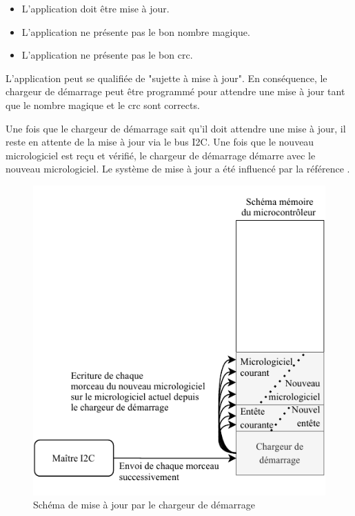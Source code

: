 \begin{itemize}
    \item L'application doit être mise à jour.
    \item L'application ne présente pas le bon nombre magique.
    \item L'application ne présente pas le bon \gls{crc}.
\end{itemize}

L'application peut se qualifiée de "sujette à mise à jour".
En conséquence, le chargeur de démarrage peut être programmé pour attendre une mise à jour tant que le nombre magique et le \gls{crc} sont corrects.

Une fois que le chargeur de démarrage sait qu'il doit attendre une mise à jour, il reste en attente de la mise à jour via le bus I2C.
Une fois que le nouveau micrologiciel est reçu et vérifié, le chargeur de démarrage démarre avec le nouveau micrologiciel.
Le système de mise à jour a été influencé par la référence \cite{reindl2020software}.

\begin{figure}[H]
    \centering
    \includegraphics[scale=1.3]{./assets/figures/bootloader_update.pdf}
    \caption{Schéma de mise à jour par le chargeur de démarrage}
\end{figure}

